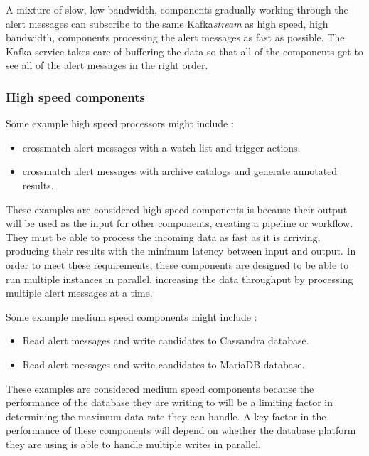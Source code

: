 \documentclass{article}
\newcommand{\kafka} {Kafka\xspace}
\newcommand{\cassandra} {Cassandra\xspace}
\newcommand{\kfstream} {\textit{stream}\xspace}
\newcommand{\mariadb} {MariaDB\xspace}
\newcommand{\crossmatch} {crossmatch\xspace}
\newcommand{\phasea} {phase A\xspace}
\newcommand{\lsstuk} {LSST:UK\xspace}
\begin{document}
A mixture of slow, low bandwidth, components gradually working through the alert messages can subscribe to the same \kafka \kfstream as high speed, high bandwidth, components processing the alert messages as fast as possible. The \kafka service takes care of buffering the data so that all of the components get to see all of the alert messages in the right order.

\subsubsection{High speed components}
\label{stage-2.high-speed.components}

Some example high speed processors might include :
\begin{itemize}
  \item \crossmatch alert messages with a watch list and trigger actions.
  \item \crossmatch alert messages with archive catalogs and generate annotated results.
\end{itemize}

These examples are considered high speed components is because their output will be used as the input for other components, creating a pipeline or workflow.
They must be able to process the incoming data as fast as it is arriving, producing their results with the minimum latency between input and output.
In order to meet these requirements, these components are designed to be able to run multiple instances in parallel, increasing the data throughput by processing multiple alert messages at a time.

Some example medium speed components might include :
\begin{itemize}
  \item Read alert messages and write candidates to \cassandra database.
  \item Read alert messages and write candidates to \mariadb database.
\end{itemize}

These examples are considered medium speed components because the performance of the database they are writing to will be a limiting factor in determining the maximum data rate they can handle. A key factor in the performance of these components will depend on whether the database platform they are using is able to handle multiple writes in parallel.

\end{document}
